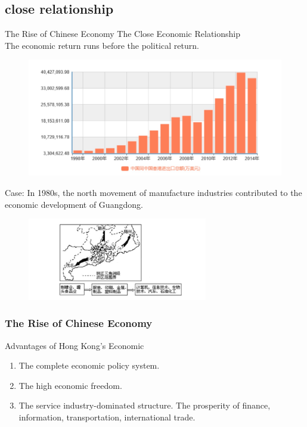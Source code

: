 \documentclass[slidestop,uncompress,mathsans, 12pt]{beamer}
\begin{document}
\subsection{close relationship}
\begin{frame}{The Rise of Chinese Economy}
The Close Economic Relationship\\
\bigskip
The economic return runs before the political return. \\
\begin{overprint}

\begin{figure}[h!]
\centering
\includegraphics[width=1.05\textwidth]{hk6.jpg}
\label{threadsVsSync}
\end{figure}
Case: In 1980s,  the north movement of manufacture industries contributed to the economic development of Guangdong.\\ 
\begin{figure}[h!]
\centering
\includegraphics[width=0.7\textwidth]{hk7.jpg}
\label{threadsVsSync}
\end{figure}
\end{overprint}
\end{frame}

\begin{frame}
\frametitle{The Rise of Chinese Economy}
Advantages of Hong Kong's Economic\\
\bigskip
\begin{enumerate}
\item The complete economic policy system.
\bigskip
\item The high economic freedom.
\bigskip
\item The service industry-dominated structure.
\bigskip 
The prosperity of finance, information, transportation, international trade.
\end{enumerate}

\end{frame}
\end{document}
